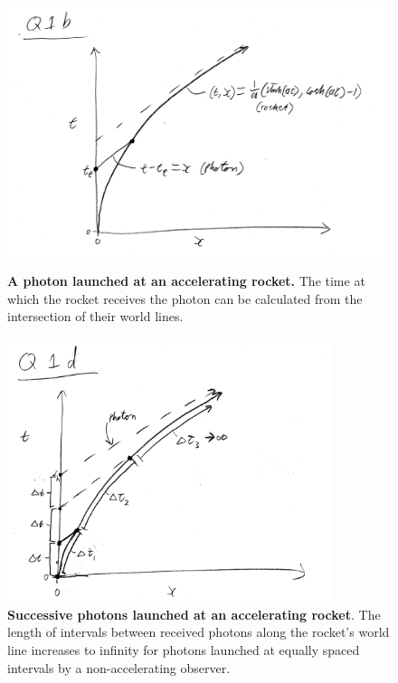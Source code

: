 \documentclass[a4paper]{article}
\begin{document}
\begin{figure}[H]
   { \centering
        \includegraphics[width=\textwidth]{Figures/1b}
        \caption{\textbf{A photon launched at an accelerating rocket.} The time at which the rocket receives the photon can be calculated from the intersection of their world lines.}
    \label{fig:1}}
    {\centering
        \includegraphics[width=0.85\textwidth]{Figures/1d}
        \caption{\textbf{Successive photons launched at an accelerating rocket}. The length of intervals between received photons along the rocket's world line increases to infinity for photons launched at equally spaced intervals by a  non-accelerating observer. }
    \label{fig:2}}
\end{figure}




\end{document}
